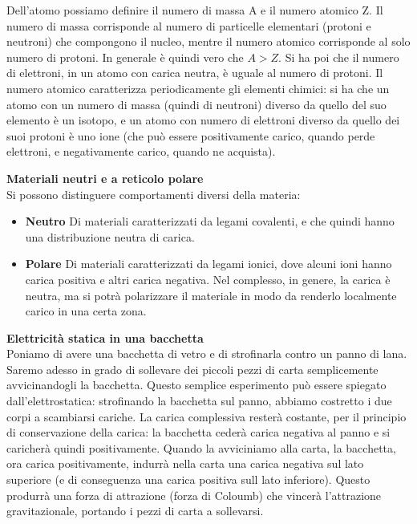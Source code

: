 \documentclass[a4paper,12pt]{article}
\begin{document}
Dell'atomo possiamo definire il numero di massa A e il numero atomico Z. Il numero di massa corrisponde al numero
di particelle elementari (protoni e neutroni) che compongono il nucleo, mentre il numero atomico corrisponde al solo
numero di protoni. In generale è quindi vero che $A>Z$. Si ha poi che il numero di elettroni, in un atomo con carica neutra,
è uguale al numero di protoni. Il numero atomico caratterizza periodicamente gli elementi chimici: si ha che un atomo con un numero di massa (quindi
di neutroni) diverso da quello del suo elemento è un isotopo, e un atomo con numero di elettroni diverso da quello dei suoi protoni è uno ione (che può essere positivamente carico,
quando perde elettroni, e negativamente carico, quando ne acquista).
\par\smallskip
\textbf{Materiali neutri e a reticolo polare} \\
Si possono distinguere comportamenti diversi della materia:
\begin{itemize}
  \item \textbf{Neutro}
    Di materiali caratterizzati da legami covalenti, e che quindi hanno una distribuzione neutra di carica.
  \item \textbf{Polare}
    Di materiali caratterizzati da legami ionici, dove alcuni ioni hanno carica positiva e altri carica negativa. Nel complesso,
    in genere, la carica è neutra, ma si potrà polarizzare il materiale in modo da renderlo localmente carico in una certa zona.
\end{itemize}
\par\smallskip
\textbf{Elettricità statica in una bacchetta} \\
Poniamo di avere una bacchetta di vetro e di strofinarla contro un panno di lana. Saremo adesso in grado di sollevare
dei piccoli pezzi di carta semplicemente avvicinandogli la bacchetta. Questo semplice esperimento può essere spiegato dall'elettrostatica:
strofinando la bacchetta sul panno, abbiamo costretto i due corpi a scambiarsi cariche. La carica complessiva resterà costante, per il principio di
conservazione della carica: la bacchetta cederà carica negativa al panno e si caricherà quindi positivamente. Quando la avviciniamo alla carta, la bacchetta,
ora carica positivamente, indurrà nella carta una carica negativa sul lato superiore (e di conseguenza una carica positiva sull lato inferiore). 
Questo produrrà una forza di attrazione (forza di Coloumb) che vincerà l'attrazione gravitazionale,
portando i pezzi di carta a sollevarsi.
\par\smallskip
\end{document}
